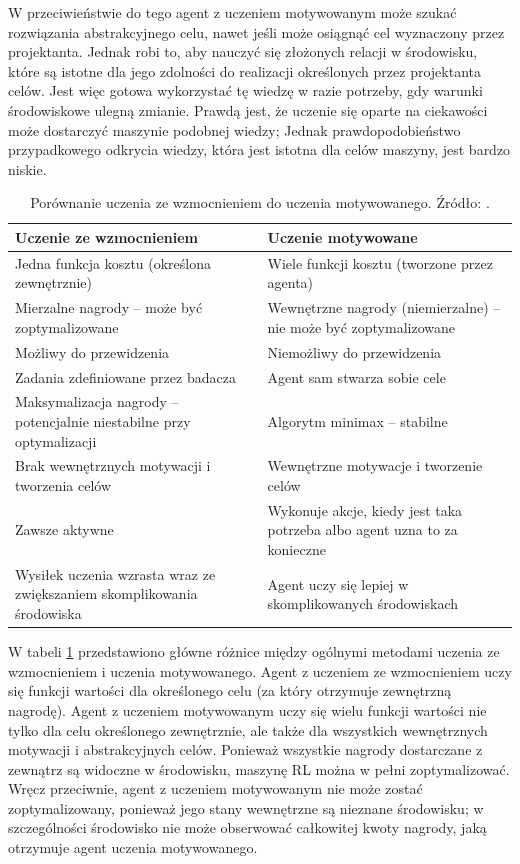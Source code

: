 W przeciwieństwie do tego agent z uczeniem motywowanym może szukać rozwiązania 
abstrakcyjnego 
celu, nawet jeśli może osiągnąć cel wyznaczony przez projektanta. Jednak robi 
to, aby nauczyć się złożonych relacji w środowisku, które są istotne dla jego 
zdolności do realizacji określonych przez projektanta celów. Jest więc gotowa 
wykorzystać tę wiedzę w razie potrzeby, gdy warunki środowiskowe ulegną 
zmianie. Prawdą jest, że uczenie się oparte na ciekawości może dostarczyć 
maszynie podobnej wiedzy; Jednak prawdopodobieństwo przypadkowego odkrycia 
wiedzy, która jest istotna dla celów maszyny, jest bardzo niskie.

\begin{table}[H]
	\centering
	\caption{Porównanie uczenia ze wzmocnieniem do uczenia motywowanego. 
	Źródło: \cite{ml_comp_int}.}
	\begin{tabular}{|p{}|p{}|}
		\hline
		\textbf{Uczenie ze wzmocnieniem} & \textbf{Uczenie motywowane} \\
		\hline
		Jedna funkcja kosztu (określona zewnętrznie) & Wiele funkcji kosztu 
		(tworzone przez agenta) \\
		\hline
		Mierzalne nagrody -- może być zoptymalizowane & Wewnętrzne nagrody 
		(niemierzalne) -- nie może być zoptymalizowane \\
		\hline
		Możliwy do przewidzenia & Niemożliwy do przewidzenia \\
		\hline
		Zadania zdefiniowane przez badacza & Agent sam stwarza sobie cele \\
		\hline
		Maksymalizacja nagrody -- potencjalnie niestabilne przy optymalizacji & 
		Algorytm minimax -- stabilne \\
		\hline
		Brak wewnętrznych motywacji i tworzenia celów & Wewnętrzne motywacje 
		i tworzenie celów \\
		\hline
		Zawsze aktywne & Wykonuje akcje, kiedy jest taka potrzeba albo agent 
		uzna 
		to za konieczne \\
		\hline
		Wysiłek uczenia wzrasta wraz ze zwiększaniem skomplikowania środowiska 
		& 
		Agent uczy się lepiej w skomplikowanych środowiskach \\
		\hline
	\end{tabular}
	\label{tab:ml_vs_rl}
\end{table}

W tabeli \ref{tab:ml_vs_rl} przedstawiono główne różnice między ogólnymi 
metodami uczenia ze wzmocnieniem i uczenia motywowanego. Agent z uczeniem ze 
wzmocnieniem uczy się funkcji wartości dla określonego celu (za który otrzymuje 
zewnętrzną nagrodę). Agent z uczeniem motywowanym uczy się wielu funkcji 
wartości nie tylko dla celu określonego zewnętrznie, ale także dla wszystkich 
wewnętrznych motywacji i abstrakcyjnych celów. Ponieważ wszystkie nagrody 
dostarczane z zewnątrz są widoczne w środowisku, maszynę RL można w pełni 
zoptymalizować. Wręcz przeciwnie, agent z uczeniem motywowanym nie może zostać 
zoptymalizowany, ponieważ jego stany wewnętrzne są nieznane środowisku; w 
szczególności środowisko nie może obserwować całkowitej kwoty nagrody, jaką 
otrzymuje agent uczenia motywowanego.

